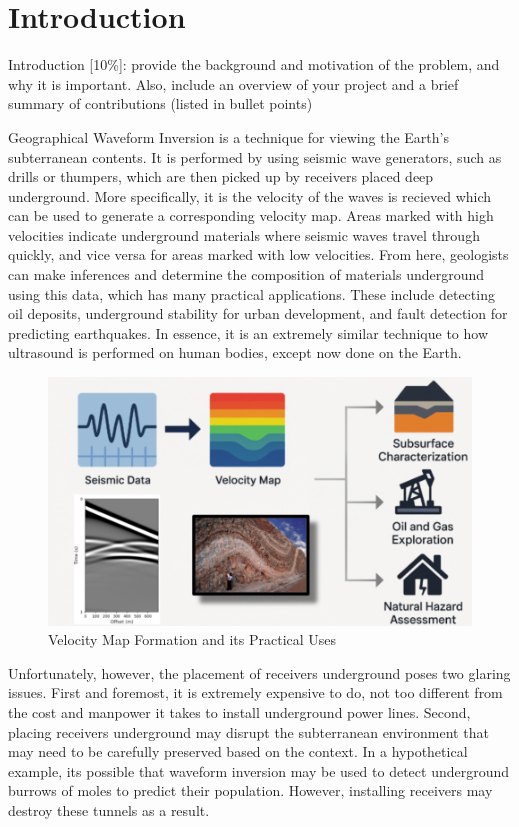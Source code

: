\documentclass{article}
\newcommand{\instructions}[1]{{\color{blue} #1}}
\begin{document}


\section{Introduction}
\instructions{Introduction [10\%]: provide the background and motivation of the problem, and why it is important. Also, include an overview of your project and a brief summary of contributions (listed in bullet points)} 

    Geographical Waveform Inversion is a technique for viewing the Earth's subterranean contents. It is performed by using seismic wave generators, such as drills or thumpers, which are then picked up by receivers placed deep underground. More specifically, it is the velocity of the waves is recieved which can be used to generate a corresponding velocity map. Areas marked with high velocities indicate underground materials where seismic waves travel through quickly, and vice versa for areas marked with low velocities. From here, geologists can make inferences and determine the composition of materials underground using this data, which has many practical applications. These include detecting oil deposits, underground stability for urban development, and fault detection for predicting earthquakes. In essence, it is an extremely similar technique to how ultrasound is performed on human bodies, except now done on the Earth.  

    \begin{figure}[H]
        \centering
        \includegraphics[width=0.5\linewidth]{figures/intro2.png}
        \caption{Velocity Map Formation and its Practical Uses }
        \label{fig:intro2}
    \end{figure}
    
    Unfortunately, however, the placement of receivers underground poses two glaring issues. First and foremost, it is extremely expensive to do, not too different from the cost and manpower it takes to install underground power lines. Second, placing receivers underground may disrupt the subterranean environment that may need to be carefully preserved based on the context. In a hypothetical example, its possible that waveform inversion may be used to detect underground burrows of moles to predict their population. However, installing receivers may destroy these tunnels as a result.  
\end{document}
